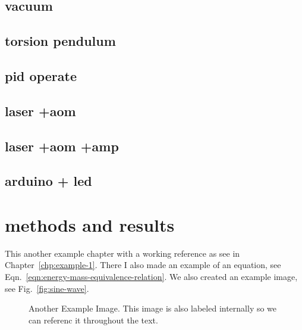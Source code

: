 \documentclass[\main/master.tex]{subfiles}
\begin{document}
\section{vacuum}
\section{torsion pendulum}
\section{pid operate}
\section{laser +aom}
\section{laser +aom +amp}
\section{arduino + led}


\chapter{methods and results}\label{chp:example-2}
\doublespacing
\hspace{5 mm} This another example chapter with a working reference as see in Chapter~\ref{chp:example-1}. There I also made an example of an equation, see Eqn.~\ref{eqn:energy-mass-equivalence-relation}. We also created an example image, see Fig.~\ref{fig:sine-wave}.
\begin{figure}[htbp]
	\centering
	\caption[Another Example Image]{Another Example Image. This image is also labeled internally so we can referenc it throughout the text.}
	\label{fig:cosine-wave}
\end{figure}
\end{document}
